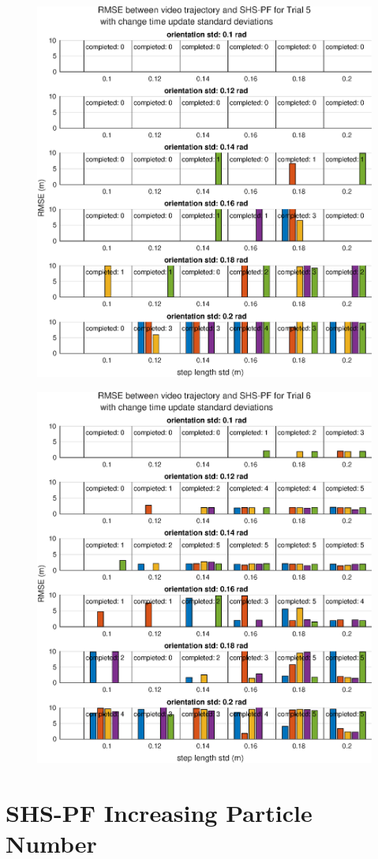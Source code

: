 \begin{figure}[H]
	\centering
	\includegraphics[width=0.6\linewidth]{images/20201201_0951_RMSE_between_video_trajectory_and_SHS-PF_for_Trial_5_1}
	\setlength{\belowcaptionskip}{-20pt}
	\caption{}
	\label{fig:202012010951rmsebetweenvideotrajectoryandshs-pffortrial51}
\end{figure}
\begin{figure}[H]
	\centering
	\includegraphics[width=0.6\linewidth]{images/20201201_0952_RMSE_between_video_trajectory_and_SHS-PF_for_Trial_6_1}
	\setlength{\belowcaptionskip}{-20pt}
	\caption{}
	\label{fig:202012010952rmsebetweenvideotrajectoryandshs-pffortrial61}
\end{figure}




\newpage
\section{SHS-PF Increasing Particle Number}
\label{app:SHS-PF trials}

